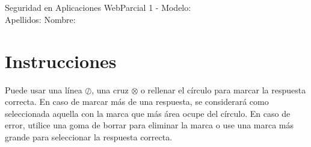 \documentclass[a4paper,12pt]{article}
\title{{\subjectname} \\ \examname}
\author{}
\date{}
\newcommand{\subjectname}{Seguridad en Aplicaciones Web}
\newcommand{\examname}{Parcial 1 - Modelo: \underline{\hspace{2cm}}}
\begin{document}

\vspace*{-3mm}

\noindent\subjectname \hfill \examname \\ 

\noindent Apellidos: \underline{\hspace{8cm}} \hfill Nombre: \underline{\hspace{6cm}}

\vspace*{-5mm}

\section*{Instrucciones}

\vspace*{-2mm}

Puede usar una línea $\oslash$, una cruz $\otimes $ o rellenar el círculo  para marcar la respuesta correcta. En caso de marcar más de una respuesta, se considerará como seleccionada aquella con la marca que más área ocupe del círculo. En caso de error, utilice una goma de borrar para eliminar la marca o use una marca más grande para seleccionar la respuesta correcta. 

\vspace*{-5mm}
\end{document}
